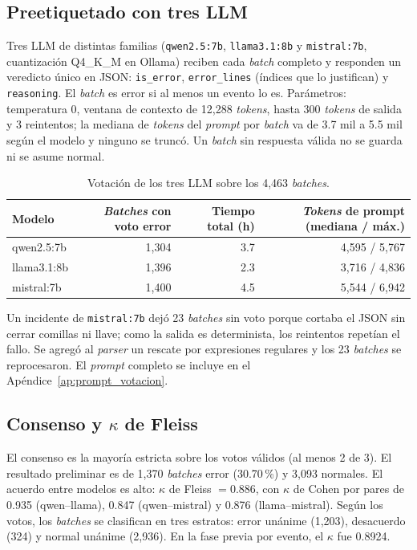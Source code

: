 \subsection{Preetiquetado con tres LLM}\label{subsec:met_votacion}

Tres LLM de distintas familias (\texttt{qwen2.5:7b}, \texttt{llama3.1:8b} y \texttt{mistral:7b}, cuantización Q4\_K\_M en Ollama) reciben cada \textit{batch} completo y responden un veredicto único en JSON: \texttt{is\_error}, \texttt{error\_lines} (índices que lo justifican) y \texttt{reasoning}. El \textit{batch} es error si al menos un evento lo es. Parámetros: temperatura 0, ventana de contexto de 12{,}288 \textit{tokens}, hasta 300 \textit{tokens} de salida y 3 reintentos; la mediana de \textit{tokens} del \textit{prompt} por \textit{batch} va de 3.7 mil a 5.5 mil según el modelo y ninguno se truncó. Un \textit{batch} sin respuesta válida no se guarda ni se asume normal.

\begin{table}[H]
\centering
\caption{Votación de los tres LLM sobre los 4{,}463 \textit{batches}.}
\label{tab:met_votos}
\small
\begin{tabular}{@{}lrrr@{}}
\toprule
\textbf{Modelo} & \textbf{\textit{Batches} con voto error} & \textbf{Tiempo total (h)} & \textbf{\textit{Tokens} de prompt (mediana / máx.)} \\
\midrule
qwen2.5:7b & 1{,}304 & 3.7 & 4{,}595 / 5{,}767 \\
llama3.1:8b & 1{,}396 & 2.3 & 3{,}716 / 4{,}836 \\
mistral:7b & 1{,}400 & 4.5 & 5{,}544 / 6{,}942 \\
\bottomrule
\end{tabular}
\normalsize
\end{table}

Un incidente de \texttt{mistral:7b} dejó 23 \textit{batches} sin voto porque cortaba el JSON sin cerrar comillas ni llave; como la salida es determinista, los reintentos repetían el fallo. Se agregó al \textit{parser} un rescate por expresiones regulares y los 23 \textit{batches} se reprocesaron. El \textit{prompt} completo se incluye en el Apéndice~\ref{ap:prompt_votacion}.

\subsection{Consenso y $\kappa$ de Fleiss}\label{subsec:met_kappa}

El consenso es la mayoría estricta sobre los votos válidos (al menos 2 de 3). El resultado preliminar es de 1{,}370 \textit{batches} error (30.70\,\%) y 3{,}093 normales. El acuerdo entre modelos es alto: $\kappa$ de Fleiss $=0.886$, con $\kappa$ de Cohen por pares de 0.935 (qwen--llama), 0.847 (qwen--mistral) y 0.876 (llama--mistral). Según los votos, los \textit{batches} se clasifican en tres estratos: error unánime (1{,}203), desacuerdo (324) y normal unánime (2{,}936). En la fase previa por evento, el $\kappa$ fue 0.8924.

